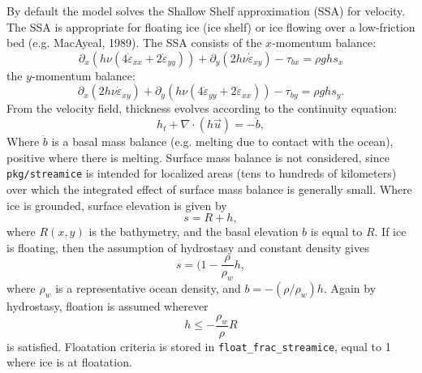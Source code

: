 By default the model solves the Shallow Shelf approximation (SSA) for velocity.
The SSA is appropriate for floating ice (ice shelf) or ice flowing over a
low-friction bed (e.g. MacAyeal, 1989). The SSA consists of the $x$-momentum
balance:
\begin{equation}
\label{eq:xmom}
 \partial_x(h\nu(4\dot{\varepsilon}_{xx}+2\dot{\varepsilon}_{yy})) +
\partial_y(2h\nu\dot{\varepsilon}_{xy}) - \tau_{bx} = \rho g h s_x 
\end{equation}
the $y$-momentum balance:
\begin{equation}
\label{eq:ymom}
 \partial_x(2h\nu\dot{\varepsilon}_{xy}) +
\partial_y(h\nu(4\dot{\varepsilon}_{yy}+2\dot{\varepsilon}_{xx})) - \tau_{by} =
\rho g h s_y.
\end{equation}
From the velocity field, thickness evolves according to the continuity equation:
\begin{equation}
\label{eq:contEq}
 h_t + \nabla\cdot(h\vec{u}) = -\dot{b},
\end{equation}
Where $\dot{b}$ is a basal mass balance (e.g. melting due to contact with the
ocean), positive where there is melting. Surface mass balance is not considered,
since {\tt pkg/streamice} is intended for localized areas (tens to hundreds of
kilometers) over which the integrated effect of surface mass balance is
generally small. Where ice is grounded, surface elevation is given by 
\begin{equation}
 s = R + h,
\end{equation}
where $R(x,y)$ is the bathymetry, and the basal elevation $b$ is equal to $R$.
If ice is floating, then the assumption of hydrostasy and constant density gives
\begin{equation}
 s = (1-\frac{\rho}{\rho_w} h,
\end{equation}
where $\rho_w$ is a representative ocean density, and $b=-(\rho/\rho_w)h$. Again
by hydrostasy, floation is assumed wherever
\begin{equation}
 h \leq -\frac{\rho_w}{\rho}R
\end{equation}
is satisfied. Floatation criteria is stored in \texttt{float\_frac\_streamice}, equal to 1 where ice is at floatation.

